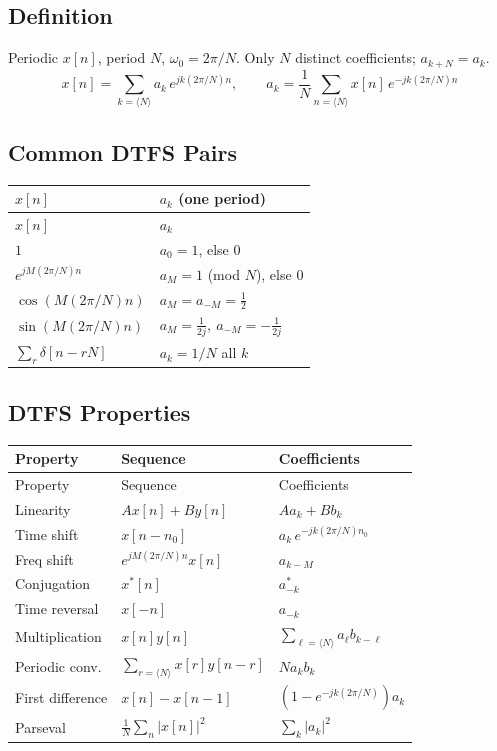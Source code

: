 \documentclass[10pt]{article}
\begin{document}
\subsection{Definition}
Periodic $x[n]$, period $N$, $\omega_0 = 2\pi/N$. Only $N$ distinct coefficients; $a_{k+N} = a_k$.
\[
x[n] = \sum_{k=\langle N\rangle} a_k\,e^{jk(2\pi/N)n},\qquad
a_k = \frac{1}{N}\sum_{n=\langle N\rangle} x[n]\,e^{-jk(2\pi/N)n}
\]

\subsection{Common DTFS Pairs}
\begin{longtable}{@{}ll@{}}
\toprule $x[n]$ & $a_k$ (one period) \\ \midrule \endfirsthead
\toprule $x[n]$ & $a_k$ \\ \midrule \endhead
\bottomrule \endfoot
$1$ & $a_0 = 1$, else $0$ \\
$e^{jM(2\pi/N)n}$ & $a_M = 1$ (mod $N$), else $0$ \\
$\cos\!\left(M(2\pi/N)n\right)$ & $a_M = a_{-M} = \tfrac{1}{2}$ \\
$\sin\!\left(M(2\pi/N)n\right)$ & $a_M = \tfrac{1}{2j},\ a_{-M} = -\tfrac{1}{2j}$ \\
$\sum_r \delta[n - rN]$ & $a_k = 1/N$ all $k$ \\
\end{longtable}

\subsection{DTFS Properties}
\begin{longtable}{@{}lll@{}}
\toprule Property & Sequence & Coefficients \\ \midrule \endfirsthead
\toprule Property & Sequence & Coefficients \\ \midrule \endhead
\bottomrule \endfoot
Linearity & $Ax[n] + By[n]$ & $Aa_k + Bb_k$ \\
Time shift & $x[n - n_0]$ & $a_k\,e^{-jk(2\pi/N)n_0}$ \\
Freq shift & $e^{jM(2\pi/N)n} x[n]$ & $a_{k-M}$ \\
Conjugation & $x^*[n]$ & $a_{-k}^*$ \\
Time reversal & $x[-n]$ & $a_{-k}$ \\
Multiplication & $x[n]y[n]$ & $\sum_{\ell=\langle N\rangle} a_\ell b_{k-\ell}$ \\
Periodic conv. & $\sum_{r=\langle N\rangle} x[r]y[n-r]$ & $N a_k b_k$ \\
First difference & $x[n] - x[n-1]$ & $(1 - e^{-jk(2\pi/N)})a_k$ \\
Parseval & $\tfrac{1}{N}\sum_{n}|x[n]|^2$ & $\sum_k |a_k|^2$ \\
\end{longtable}
\end{document}
